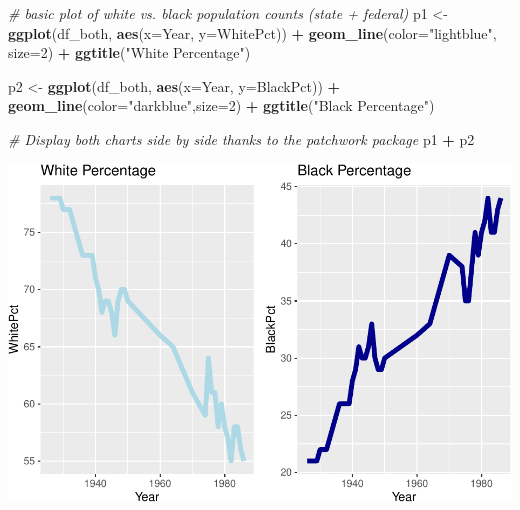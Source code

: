 \documentclass[
]{article}
\newenvironment{Shaded}{\begin{snugshade}}{\end{snugshade}}
\newcommand{\AttributeTok}[1]{\textcolor[rgb]{0.13,0.29,0.53}{#1}}
\newcommand{\CommentTok}[1]{\textcolor[rgb]{0.56,0.35,0.01}{\textit{#1}}}
\newcommand{\DecValTok}[1]{\textcolor[rgb]{0.00,0.00,0.81}{#1}}
\newcommand{\FunctionTok}[1]{\textcolor[rgb]{0.13,0.29,0.53}{\textbf{#1}}}
\newcommand{\NormalTok}[1]{#1}
\newcommand{\OtherTok}[1]{\textcolor[rgb]{0.56,0.35,0.01}{#1}}
\newcommand{\SpecialCharTok}[1]{\textcolor[rgb]{0.81,0.36,0.00}{\textbf{#1}}}
\newcommand{\StringTok}[1]{\textcolor[rgb]{0.31,0.60,0.02}{#1}}
\begin{document}
\begin{Shaded}
\begin{Highlighting}[]
\CommentTok{\# basic plot of white vs. black population counts (state + federal)}
\NormalTok{p1 }\OtherTok{\textless{}{-}} \FunctionTok{ggplot}\NormalTok{(df\_both, }\FunctionTok{aes}\NormalTok{(}\AttributeTok{x=}\NormalTok{Year, }\AttributeTok{y=}\NormalTok{WhitePct)) }\SpecialCharTok{+}
  \FunctionTok{geom\_line}\NormalTok{(}\AttributeTok{color=}\StringTok{"lightblue"}\NormalTok{, }\AttributeTok{size=}\DecValTok{2}\NormalTok{) }\SpecialCharTok{+}
  \FunctionTok{ggtitle}\NormalTok{(}\StringTok{"White Percentage"}\NormalTok{)}

\NormalTok{p2 }\OtherTok{\textless{}{-}} \FunctionTok{ggplot}\NormalTok{(df\_both, }\FunctionTok{aes}\NormalTok{(}\AttributeTok{x=}\NormalTok{Year, }\AttributeTok{y=}\NormalTok{BlackPct)) }\SpecialCharTok{+}
  \FunctionTok{geom\_line}\NormalTok{(}\AttributeTok{color=}\StringTok{"darkblue"}\NormalTok{,}\AttributeTok{size=}\DecValTok{2}\NormalTok{) }\SpecialCharTok{+}
  \FunctionTok{ggtitle}\NormalTok{(}\StringTok{"Black Percentage"}\NormalTok{)}
\end{Highlighting}
\end{Shaded}

\begin{Shaded}
\begin{Highlighting}[]
\CommentTok{\# Display both charts side by side thanks to the patchwork package}
\NormalTok{p1 }\SpecialCharTok{+}\NormalTok{ p2}
\end{Highlighting}
\end{Shaded}

\includegraphics{apr19memo_files/figure-latex/unnamed-chunk-5-1.pdf}
\end{document}
